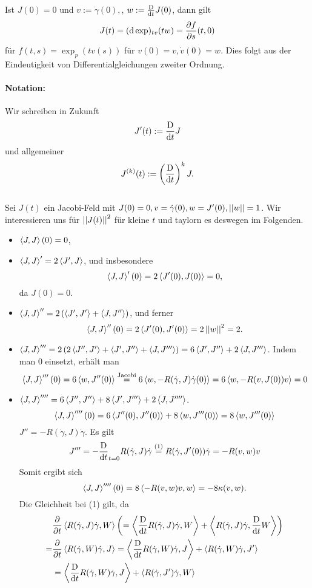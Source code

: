 
\Bem{}
Ist $J(0) = 0$ und $ v := \dot{\gamma}(0),$, $w := \frac{\text{D}}{\text{d} t}J(0)$, dann gilt
\[ J(t) = (\text{d} \exp)_{tv}(tw) = \frac{\partial f}{\partial s}(t,0) \]
für $f(t,s) = \exp_{p}(tv(s))$ für $v(0) = v, \dot{v}(0) = w$. Dies folgt aus der Eindeutigkeit von Differentialgleichungen zweiter Ordnung.

\paragraph{Notation:}
Wir schreiben in Zukunft
\[J'(t) := \frac{\text{D}}{\text{d} t}J \]
und allgemeiner
\[ J^{(k)}(t) := \left(\frac{\text{D}}{\text{d} t}\right)^k J. \]
\vspace{12mm}\\
Sei $J(t)$ ein Jacobi-Feld mit $J(0) = 0, v = \dot{\gamma}(0), w = J'(0), \left|\left|w\right|\right| = 1$.
Wir interessieren uns für $\left|\left|J(t)\right|\right|^2$ für kleine $t$ und taylorn es deswegen im Folgenden.
\begin{itemize}
	\item $\left<J,J\right>(0) = 0$,
	\item $\left<J,J\right>' = 2 \left<J',J\right>$, und insbesondere
	\[ \left<J,J\right>'(0) = 2\left<J'(0),J(0)\right> = 0, \]
	da $J(0) = 0$.
	\item $\left<J,J\right>'' = 2 \left( \left<J',J'\right> + \left<J,J''\right> \right)$, und ferner
	\[ \left<J,J\right>''(0) = 2\left<J'(0), J'(0)\right> = 2\left|\left|w\right|\right|^2 = 2. \]
	\item $\left<J,J\right>''' = 2\left( 
2\left<J'',J'\right> + \left<J',J''\right> + \left<J,J'''\right>	
 \right) = 6 \left<J',J''\right> + 2 \left<J,J'''\right>$. Indem man $0$ einsetzt, erhält man
\[ \left<J,J\right>'''(0) = 6 \left<w, J''(0)\right> \overset{\mathrm{Jacobi}}{=} 6 \left<w, - R(\dot{\gamma},J)\dot{\gamma}(0)\right> = 
 6 \left<w, - R(v,J(0))v\right> = 0
 \]
	\item $\left<J,J\right>'''' = 6 \left<J'',J''\right> + 8\left<J',J'''\right> + 2 \left<J,J''''\right>$.
	\[ \left<J,J\right>''''(0) = 6\left<J''(0), J''(0)\right> + 8\left<w, J'''(0)\right> = 8\left<w, J'''(0)\right>  \] 
	$J'' = - R(\dot{\gamma}, J) \dot{\gamma}$. Es gilt
	\begin{align*}
	J''' = - \frac{\text{D}}{\text{d} t}_{t= 0} R(\dot{\gamma}, J)\dot{\gamma} \overset{(1)}{=}  R(\dot{\gamma}, J'(0))\dot{\gamma} = -R(v,w)v
	\end{align*}
	Somit ergibt sich
		\[ \left<J,J\right>''''(0) = 8\left< -R(v,w)v, w\right> = -8\kappa(v,w).  \] 
	Die Gleichheit bei (1) gilt, da
	\begin{align*}
	&\frac{\partial }{\partial t} \left<R(\dot{\gamma}, J)\dot{\gamma}, W\right> \left(= \left< \frac{\text{D}}{\text{d} t}R(\dot{\gamma}, J)\dot{\gamma}, W \right> + \left<R(\dot{\gamma},J)\dot{\gamma}, \frac{\text{D}}{\text{d} t}W\right>\right)\\
=	&\frac{\partial }{\partial t} \left<R(\dot{\gamma}, W)\dot{\gamma}, J\right> = \left< \frac{\text{D}}{\text{d} t}R(\dot{\gamma}, W)\dot{\gamma}, J \right> + \left<R(\dot{\gamma},W)\dot{\gamma}, J'\right>\\
	&=\left< \frac{\text{D}}{\text{d} t}R(\dot{\gamma}, W)\dot{\gamma}, J \right> + \left<R(\dot{\gamma},J')\dot{\gamma}, W\right>
	\end{align*}
\end{itemize}
